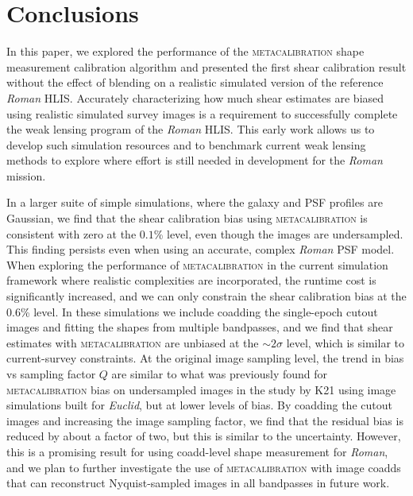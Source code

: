 \documentclass[fleqn,usenatbib]{mnras}
\begin{document}
\section{Conclusions}\label{sec:conclusion}

In this paper, we explored the performance of the \textsc{metacalibration} shape measurement calibration algorithm and presented the first shear calibration result without the effect of blending on a realistic simulated version of the reference \emph{Roman} HLIS. Accurately characterizing how much shear estimates are biased using realistic simulated survey images is a requirement to successfully complete the weak lensing program of the \emph{Roman} HLIS. This early work allows us to develop such simulation resources and to benchmark current weak lensing methods to explore where effort is still needed in development for the \emph{Roman} mission. 

In a larger suite of simple simulations, where the galaxy and PSF profiles are Gaussian, we find that the shear calibration bias using \textsc{metacalibration} is consistent with zero at the $0.1$\% level, even though the images are undersampled. This finding persists even when using an accurate, complex \emph{Roman} PSF model. When exploring the performance of \textsc{metacalibration} in the current simulation framework where realistic complexities are incorporated, the runtime cost is significantly increased, and we can only constrain the shear calibration bias at the $0.6$\% level. In these simulations we include coadding the single-epoch cutout images and fitting the shapes from multiple bandpasses, and we find that shear estimates with \textsc{metacalibration} are unbiased at the $\sim 2\sigma$ level, which is similar to current-survey constraints. At the original image sampling level, the trend in bias vs sampling factor $Q$ are similar to what was previously found for \textsc{metacalibration} bias on undersampled images in the study by K21 using image simulations built for \emph{Euclid}, but at lower levels of bias. By coadding the cutout images and increasing the image sampling factor, we find that the residual bias is reduced by about a factor of two, but this is similar to the uncertainty. However, this is a promising result for using coadd-level shape measurement for \emph{Roman}, and we plan to further investigate the use of \textsc{metacalibration} with image coadds that can reconstruct Nyquist-sampled images in all bandpasses in future work.
\end{document}
